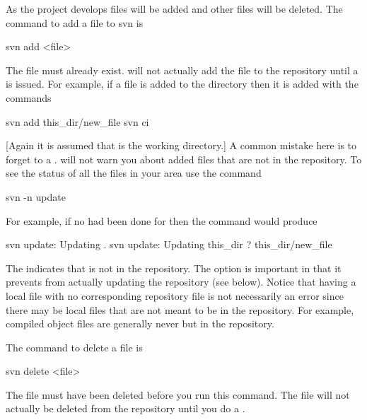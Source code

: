 As the project develops files will be added and other files will be
deleted. The command to add a file to svn is
\begin{example}
  svn add <file>
\end{example}
The file must already exist. \svn will not actually add the file to
the repository until a  is issued. For example, if a file
 is added to the  directory then it is added
with the commands
\begin{example}
  svn add this_dir/new_file
  svn ci
\end{example}
[Again it is assumed that  is the working directory.] A common
mistake here is to forget to a .  will not warn
you about added files that are not in the repository. To see the
status of all the files in your area use the command
\begin{example}
  svn -n update
\end{example}
For example, if no  had been done for  then
the  command would produce
\begin{example}
  svn update: Updating .
  svn update: Updating this_dir
  ? this_dir/new_file
\end{example}
The  indicates that  is not in the repository. The
 option is important in that it prevents  from actually
updating the repository (see below). Notice that having a local file
with no corresponding repository file is not necessarily an error
since there may be local files that are not meant to be in the
repository. For example, compiled object files are generally never but
in the repository.

The command to delete a file is
\begin{example}
  svn delete <file>
\end{example}
The file must have been deleted before you run this command. The file
will not actually be deleted from the repository until you do a
.

